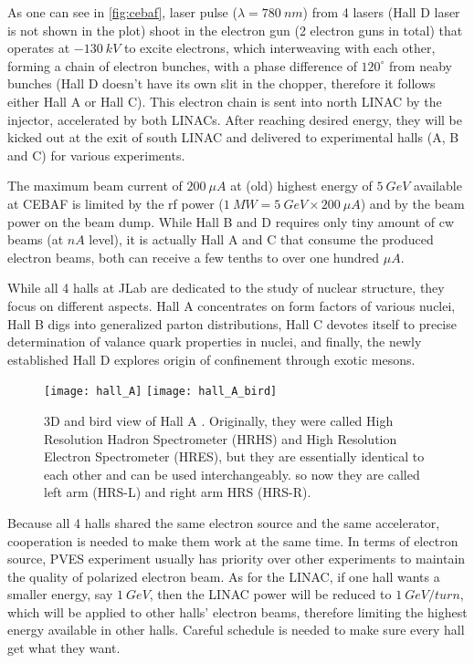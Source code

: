 As one can see in \ref{fig:cebaf}, laser pulse ($\lambda = 780 \ nm$) from 4 lasers 
(Hall D laser is not shown in the plot) shoot in the electron gun 
(2 electron guns in total) that 
operates at $-130\ kV$ to excite electrons, which interweaving with each other, 
forming a chain of electron bunches, with a phase difference of $120^\circ$ from 
neaby bunches (Hall D doesn't have its own slit in the chopper, therefore 
it follows either Hall A or Hall C). This electron chain is sent into north LINAC
by the injector, accelerated by both LINACs. After reaching desired energy,
they will be kicked out at the exit of south LINAC and delivered to experimental
halls (A, B and C) for various experiments. 

The maximum beam current of $200\ \mu A$ at (old) highest energy of $5\ GeV$ 
available at CEBAF is limited by the rf power ($1\ MW = 5\ GeV \times 200\ \mu A$) 
and by the beam power on the beam dump. While Hall B and D requires only tiny 
amount of cw beams (at $nA$ level), it is actually Hall A and C that consume 
the produced electron beams, both can receive a few tenths to over one 
hundred $\mu A$.

While all 4 halls at JLab are dedicated to the study of nuclear structure, they
focus on different aspects. Hall A concentrates on form factors of various nuclei, 
Hall B digs into generalized parton distributions, Hall C devotes itself to precise
determination of valance quark properties in nuclei, and finally, the newly 
established Hall D explores origin of confinement through exotic mesons.
\begin{figure}[h!]
    \centering
    \texttt{[image: hall\_A]}
    \texttt{[image: hall\_A\_bird]}
    \caption{3D and bird view of Hall A \cite{halla_manual}. Originally, they
    were called High Resolution Hadron Spectrometer (HRHS) and High Resolution Electron
    Spectrometer (HRES), but they are essentially identical to each other and
    can be used interchangeably.
    so now they are called left arm (HRS-L) and right arm HRS (HRS-R).
    }
\end{figure}

Because all 4 halls shared the same electron source and the same accelerator, 
cooperation is needed to make them work at the same time. In terms of electron
source, PVES experiment usually has priority over other experiments to maintain 
the quality of polarized electron beam. As for the LINAC, if one hall wants
a smaller energy, say $1\ GeV$, then the LINAC power will be reduced to $1\ GeV/turn$,
which will be applied to other halls' electron beams, therefore limiting the 
highest energy available in other halls. Careful schedule is needed to make sure
every hall get what they want.
